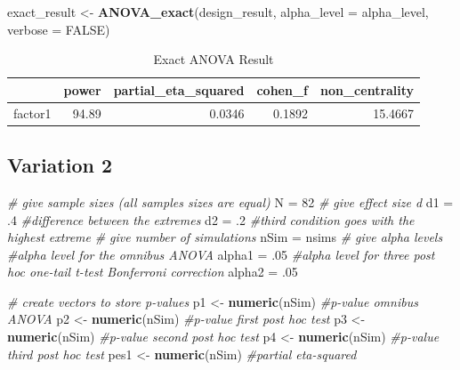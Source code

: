 \documentclass[]{book}
\newenvironment{Shaded}{\begin{snugshade}}{\end{snugshade}}
\newcommand{\CommentTok}[1]{\textcolor[rgb]{0.56,0.35,0.01}{\textit{#1}}}
\newcommand{\DataTypeTok}[1]{\textcolor[rgb]{0.13,0.29,0.53}{#1}}
\newcommand{\DecValTok}[1]{\textcolor[rgb]{0.00,0.00,0.81}{#1}}
\newcommand{\FloatTok}[1]{\textcolor[rgb]{0.00,0.00,0.81}{#1}}
\newcommand{\KeywordTok}[1]{\textcolor[rgb]{0.13,0.29,0.53}{\textbf{#1}}}
\newcommand{\NormalTok}[1]{#1}
\newcommand{\OtherTok}[1]{\textcolor[rgb]{0.56,0.35,0.01}{#1}}
\newcommand{\StringTok}[1]{\textcolor[rgb]{0.31,0.60,0.02}{#1}}
\begin{document}
\begin{Shaded}
\begin{Highlighting}[]
\NormalTok{exact_result <-}\StringTok{ }\KeywordTok{ANOVA_exact}\NormalTok{(design_result,}
                            \DataTypeTok{alpha_level =}\NormalTok{ alpha_level,}
                            \DataTypeTok{verbose =} \OtherTok{FALSE}\NormalTok{)}
\end{Highlighting}
\end{Shaded}

\begin{table}[t]

\caption{\label{tab:unnamed-chunk-65}Exact ANOVA Result}
\centering
\begin{tabular}{l|r|r|r|r}
\hline
  & power & partial\_eta\_squared & cohen\_f & non\_centrality\\
\hline
factor1 & 94.89 & 0.0346 & 0.1892 & 15.4667\\
\hline
\end{tabular}
\end{table}

\hypertarget{variation-2}{%
\subsection{Variation 2}\label{variation-2}}

\begin{Shaded}
\begin{Highlighting}[]
\CommentTok{# give sample sizes (all samples sizes are equal)}
\NormalTok{N =}\StringTok{ }\DecValTok{82}
\CommentTok{# give effect size d}
\NormalTok{d1 =}\StringTok{ }\FloatTok{.4} \CommentTok{#difference between the extremes}
\NormalTok{d2 =}\StringTok{ }\FloatTok{.2} \CommentTok{#third condition goes with the highest extreme}
\CommentTok{# give number of simulations}
\NormalTok{nSim =}\StringTok{ }\NormalTok{nsims}
\CommentTok{# give alpha levels}
\CommentTok{#alpha level for the omnibus ANOVA}
\NormalTok{alpha1 =}\StringTok{ }\FloatTok{.05} 
\CommentTok{#alpha level for three post hoc one-tail t-test Bonferroni correction}
\NormalTok{alpha2 =}\StringTok{ }\FloatTok{.05} 
\end{Highlighting}
\end{Shaded}

\begin{Shaded}
\begin{Highlighting}[]
\CommentTok{# create vectors to store p-values}
\NormalTok{p1 <-}\StringTok{ }\KeywordTok{numeric}\NormalTok{(nSim) }\CommentTok{#p-value omnibus ANOVA}
\NormalTok{p2 <-}\StringTok{ }\KeywordTok{numeric}\NormalTok{(nSim) }\CommentTok{#p-value first post hoc test}
\NormalTok{p3 <-}\StringTok{ }\KeywordTok{numeric}\NormalTok{(nSim) }\CommentTok{#p-value second post hoc test}
\NormalTok{p4 <-}\StringTok{ }\KeywordTok{numeric}\NormalTok{(nSim) }\CommentTok{#p-value third post hoc test}
\NormalTok{pes1 <-}\StringTok{ }\KeywordTok{numeric}\NormalTok{(nSim) }\CommentTok{#partial eta-squared}
\end{Highlighting}
\end{Shaded}
\end{document}
